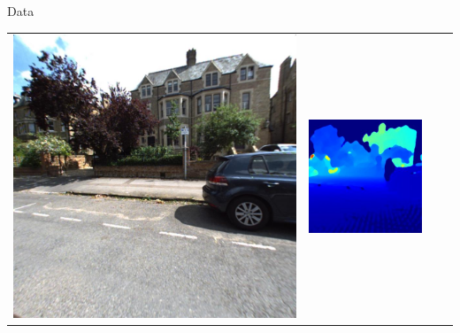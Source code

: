 \begin{frame}{Data}
\begin{tabular}{c c c c}
		\includegraphics[width=\widthcase]{images/dataset/image_000052_mono_right.jpg} & 
		\includegraphics[width=\widthcase]{images/dataset/poordepth_000052_mono_right.jpg} &

\end{tabular}
\end{frame}
